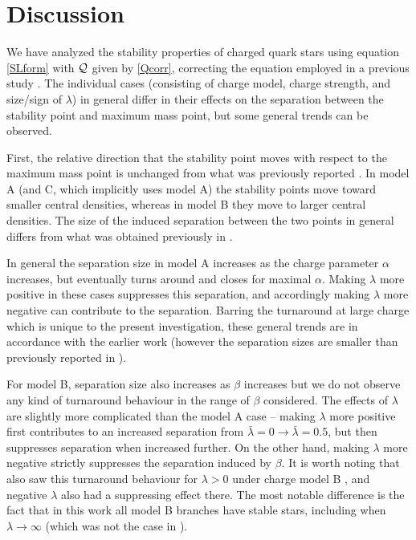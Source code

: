 \documentclass[12pt,noshowpacs,nofootinbib,notitlepage,amsmath,superscriptaddress]{revtex4-1}%
\begin{document}
\section{Discussion}\label{sec:discussion}

We have analyzed the
stability properties of charged quark stars using equation \eqref{SLform} with $\cal Q$ given by \eqref{Qcorr}, correcting the equation employed in a previous study  \cite{Goncalves:2020joq,zhang:2021}. The individual cases (consisting of charge model, charge strength, and size/sign of $\lambda$) in general differ in their effects on the separation between the stability point and maximum mass point, but some general trends can be observed.

First, the relative direction that the stability point moves with respect to the maximum mass point is unchanged from what was previously reported \cite{zhang:2021}. In model A (and C, which implicitly uses model A) the stability points move toward smaller central densities, whereas in model B they move to larger central densities. The size of the induced separation between the two points   in general differs from what was obtained previously in \cite{zhang:2021}. 

In general  the separation size in model A increases as the charge parameter $\alpha$ increases, but eventually turns around and closes for maximal $\alpha$. Making $\lambda$ more positive in these cases suppresses this separation, and accordingly making $\lambda$ more negative can contribute to the separation. Barring the turnaround at large charge which is unique to the present investigation, these general trends are in accordance with the earlier work \cite{zhang:2021} (however the separation sizes are smaller than previously reported in \cite{zhang:2021}).

For model B, separation size also increases as $\beta$ increases but we do not observe any kind of turnaround behaviour in the range of $\beta$ considered. The effects of $\lambda$ are slightly more complicated than the model A case -- making $\lambda$ more positive first contributes to an increased separation from $\bar{\lambda}=0\to\bar{\lambda}=0.5$, but then suppresses separation when increased further. On the other hand, making $\lambda$ more negative strictly suppresses the separation induced by $\beta$. It is worth noting that \cite{zhang:2021} also saw this turnaround behaviour for $\lambda>0$ under charge model B \cite{zhang:2021}, and negative $\lambda$ also had a suppressing effect there. The most notable difference is the fact that in this work all model B branches have stable stars, including when $\lambda\to\infty$ (which was not the case in \cite{zhang:2021}).
\end{document}
